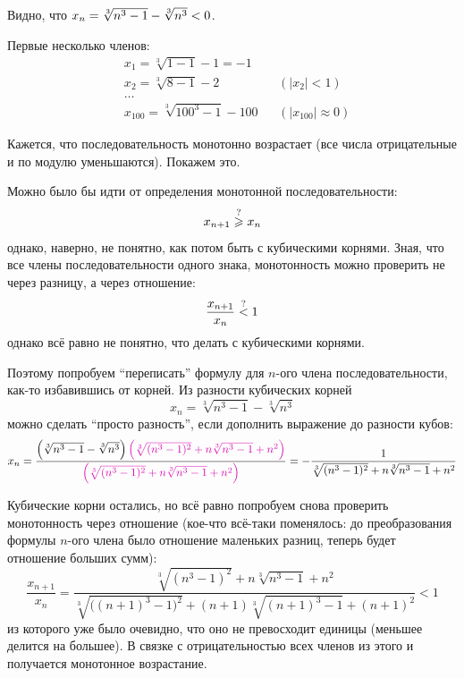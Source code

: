 \documentclass[a4paper,12pt]{article}
\begin{document}
  \begin{solution}
    Видно, что $x_n \hm= \sqrt[3]{n^3 - 1} \hm- \sqrt[3]{n^3} \hm< 0$.
    
    Первые несколько членов:
    \[
      \begin{aligned}
        &x_1 = \sqrt[3]{1 - 1} - 1 = -1 & &{}\\
        &x_2 = \sqrt[3]{8 - 1} - 2 & &(|x_2| < 1)\\
        &\ldots\\
        &x_{100} = \sqrt[3]{100^3 - 1} - 100 & &(|x_{100}| \approx 0)
      \end{aligned}
    \]
    
    Кажется, что последовательность монотонно возрастает (все числа отрицательные и по модулю уменьшаются).
    Покажем это.
    
    Можно было бы идти от определения монотонной последовательности:
    \[
      x_{n + 1} \overset{\operatorname{?}}{\geqslant} x_{n}
    \]
    однако, наверно, не понятно, как потом быть с кубическими корнями.
    Зная, что все члены последовательности одного знака, монотонность можно проверить не через разницу, а через отношение:
    \[
      \frac{x_{n + 1}}{x_n} \overset{\operatorname{?}}{<} 1
    \]
    однако всё равно не понятно, что делать с кубическими корнями.
    
    Поэтому попробуем ``переписать'' формулу для $n$-ого члена последовательности, как-то избавившись от корней.
    Из разности кубических корней
    \[
      x_n = \sqrt[3]{n^3 - 1} - \sqrt[3]{n^3}
    \]
    можно сделать ``просто разность'', если дополнить выражение до разности кубов:
    \[
      x_n = \frac{\left(\sqrt[3]{n^3 - 1} - \sqrt[3]{n^3}\right)\textcolor{pink}{\left(\sqrt[3]{(n^3 - 1)^2} + n \sqrt[3]{n^3 - 1} + n^2\right)}}{\textcolor{pink}{\left(\sqrt[3]{(n^3 - 1)^2} + n \sqrt[3]{n^3 - 1} + n^2\right)}}
          = -\frac{1}{\sqrt[3]{(n^3 - 1)^2} + n \sqrt[3]{n^3 - 1} + n^2}
    \]
    
    Кубические корни остались, но всё равно попробуем снова проверить монотонность через отношение (кое-что всё-таки поменялось: до преобразования формулы $n$-ого члена было отношение маленьких разниц, теперь будет отношение больших сумм):
    \[
      \frac{x_{n + 1}}{x_n} = \frac{\sqrt[3]{(n^3 - 1)^2} + n \sqrt[3]{n^3 - 1} + n^2}{\sqrt[3]{\bigl((n + 1)^3 - 1\bigr)^2} + (n + 1) \sqrt[3]{(n + 1)^3 - 1} + (n + 1)^2} < 1
    \]
    из которого уже было очевидно, что оно не превосходит единицы (меньшее делится на большее).
    В связке с отрицательностью всех членов из этого и получается монотонное возрастание.
  \end{solution}
  
\end{document}
